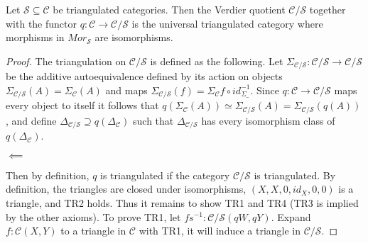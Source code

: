     \begin{theorem}
        Let $\mathcal{S}\subseteq\mathcal{C}$ be triangulated categories. Then the Verdier quotient $\mathcal{C}/\mathcal{S}$ together with the functor $q:\mathcal{C}\rightarrow\mathcal{C}/\mathcal{S}$ is the universal triangulated category where morphisms in $Mor_\mathcal{S}$ are isomorphisms.
    \end{theorem}

    \begin{proof}
        The triangulation on $\mathcal{C}/\mathcal{S}$ is defined as the following. Let $\Sigma_{\mathcal{C/S}}:\mathcal{C}/\mathcal{S}\rightarrow\mathcal{C}/\mathcal{S}$ be the additive autoequivalence defined by its action on objects $\Sigma_{\mathcal{C/S}}(A)=\Sigma_{\mathcal{C}}(A)$ and maps $\Sigma_{\mathcal{C/S}}(f) = \Sigma_{\mathcal{C}}f\circ id_{\Sigma{\_}}^{-1}$. Since $q:\mathcal{C}\rightarrow\mathcal{C}/\mathcal{S}$ maps every object to itself it follows that $q(\Sigma_{\mathcal{C}}(A)) \simeq \Sigma_{\mathcal{C/S}}(A) = \Sigma_{\mathcal{C/S}}(q(A))$, and define $\Delta_{\mathcal{C}/\mathcal{S}}\supseteq q(\Delta_\mathcal{C})$ such that $\Delta_{\mathcal{C}/\mathcal{S}}$ has every isomorphism class of $q(\Delta_\mathcal{C})$. 
        \begin{center}
            $\impliedby$
        \end{center}
        Then by definition, $q$ is triangulated if the category $\mathcal{C}/\mathcal{S}$ is triangulated.
        By definition, the triangles are closed under isomorphisms, $(X,X,0,id_X,0,0)$ is a triangle, and TR2 holds. Thus it remains to show TR1 and TR4 (TR3 is implied by the other axioms). To prove TR1, let $fs^{-1}:\mathcal{C}/\mathcal{S}(qW,qY)$. Expand $f:\mathcal{C}(X,Y)$ to a triangle in $\mathcal{C}$ with TR1, it will induce a triangle in  $\mathcal{C}/\mathcal{S}$.

\end{proof}
